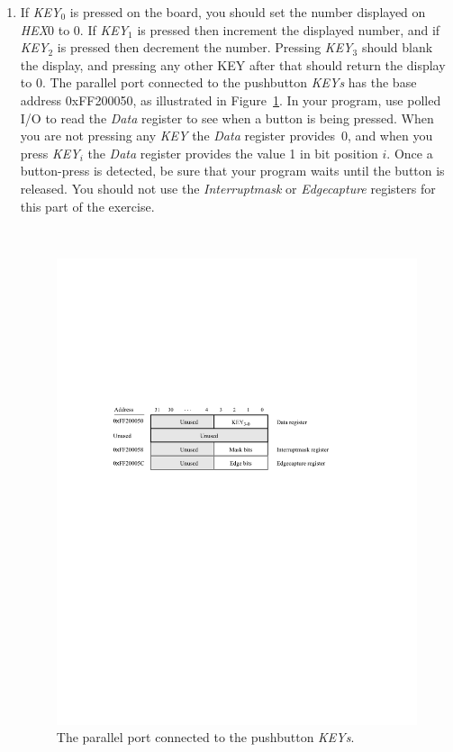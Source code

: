 \documentclass[epsfig,10pt,fullpage]{article}
\begin{document}
\begin{enumerate}
\item If {\it KEY}$_0$ is pressed on the board, you should set the number displayed on 
{\it HEX}0 to 0. If {\it KEY}$_1$ is pressed then increment the displayed number, and 
if {\it KEY}$_2$ is pressed then decrement the number. Pressing {\it KEY}$_3$ should 
blank the display, and pressing any other KEY after that should return the display to 0.
The parallel port connected to the pushbutton {\it KEYs} has the base address
{\sf 0xFF200050}, as illustrated in Figure~\ref{fig:KEY}. In your program, use polled I/O 
to read the {\it Data} register to see when a button is being pressed. When you are not pressing 
any {\it KEY} the {\it Data} register provides~0, and when you press {\it KEY}$_i$ the 
{\it Data} register provides the value 1 in bit position $i$. Once a button-press is detected,
be sure that your program waits until the button is released. You should not use the 
{\it Interruptmask} or {\it Edgecapture} registers for this part of the exercise.

~\\
\begin{figure}[htb]
	\begin{center}
	\includegraphics[scale=1]{figures/figureKEY.pdf}
	\end{center}
	\caption{The parallel port connected to the pushbutton {\it KEYs}.}
\label{fig:KEY}
\end{figure}


\end{enumerate}
\end{document}
